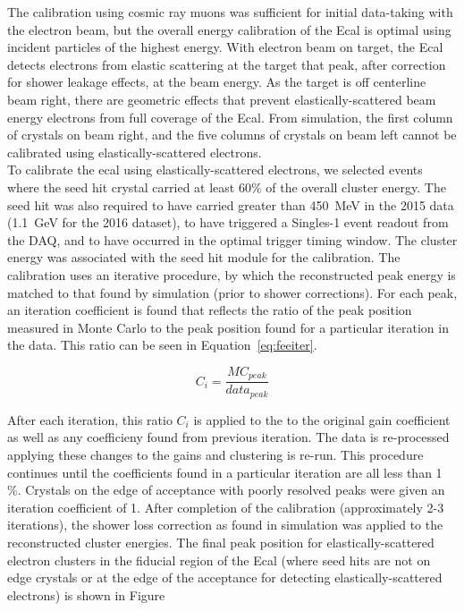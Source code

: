 The calibration using cosmic ray muons was sufficient for initial data-taking with the electron beam, but the overall energy calibration of the Ecal is optimal using incident particles of the highest energy. With electron beam on target, the Ecal detects electrons from elastic scattering at the target that peak, after correction for shower leakage effects, at the beam energy. As the target is off centerline beam right, there are geometric effects that prevent elastically-scattered beam energy electrons from full coverage of the Ecal. From simulation, the first column of crystals on beam right, and the five columns of crystals on beam left cannot be calibrated using elastically-scattered electrons. \\
\indent To calibrate the ecal using elastically-scattered electrons, we selected events where the seed hit crystal carried at least 60$\%$ of the overall cluster energy. The seed hit was also required to have carried greater than 450~MeV in the 2015 data (1.1~GeV for the 2016 dataset), to have triggered a Singles-1  event readout from the DAQ, and to have occurred in the optimal trigger timing window. The cluster energy was associated with the seed hit module for the calibration. The calibration uses an iterative procedure, by which the reconstructed peak energy is matched to that found by simulation (prior to shower corrections). For each peak, an iteration coefficient is found that reflects the ratio of the peak position measured in Monte Carlo to the peak position found for a particular iteration in the data. This ratio can be seen in Equation~\eqref{eq:feeiter}.

\begin{equation}
	\label{eq:feeiter}
	C_i = \dfrac{MC_{peak}}{data_{peak}}
\end{equation}

After each iteration, this ratio $C_i$ is applied to the to the original gain coefficient as well as any coefficieny found from previous iteration. The data is re-processed applying these changes to the gains and clustering is re-run. This procedure continues until the coefficients found in a particular iteration are all less than 1~$\%$. Crystals on the edge of acceptance with poorly resolved peaks were given an iteration coefficient of 1. After completion of the calibration (approximately 2-3 iterations), the shower loss correction as found in simulation was applied to the reconstructed cluster energies. The final peak position for elastically-scattered electron clusters in the fiducial region of the Ecal (where seed hits are not on edge crystals or at the edge of the acceptance for detecting elastically-scattered electrons) is shown in Figure

